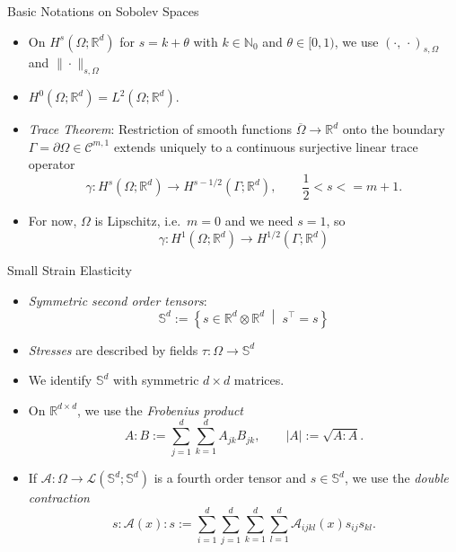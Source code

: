 \documentclass[10pt,aspectratio=169]{beamer}
\def\N{{\mathbb N}}
\def\R{{\mathbb R}}
\def\S{{\mathbb S}}
\def\cA{{\mathcal A}}
\def\cC{{\mathcal C}}
\def\cL{{\mathcal L}}
\begin{document}
\begin{frame}{Basic Notations on Sobolev Spaces}
	\begin{itemize}
		\item On $H^s(\Omega;\R^d)$ for $s =k+\theta$ with $k\in \N_0$ and $\theta\in[0,1)$, we use $(\cdot,\,\cdot)_{s,\Omega}$ and $\|\cdot\|_{s,\Omega}$
		\item $H^0(\Omega;\R^d) = L^2(\Omega;\R^d)$.
		\item {\em Trace Theorem}: Restriction of smooth functions $\overline{\Omega}\to\R^d$ onto the boundary $\Gamma = \partial\Omega\in\cC^{m,1}$ extends uniquely to a continuous surjective linear trace operator
		      \begin{equation*}
			      \gamma: H^s(\Omega;\R^d)\to H^{s-1/2}(\Gamma;\R^d),\qquad \frac{1}{2}<s<=m+1.
		      \end{equation*}
		\item For now, $\Omega$ is Lipschitz, i.e.\ $m=0$ and we need $s = 1$, so
		      \begin{equation*}
			      \gamma: H^1(\Omega;\R^d)\to H^{1/2}(\Gamma;\R^d)
		      \end{equation*}
	\end{itemize}
\end{frame}

\begin{frame}{Small Strain Elasticity}
	\begin{itemize}
		\item {\em Symmetric second order tensors}:
		      \begin{equation*}
			      \S^d:=\left\{s\in\R^d\otimes\R^d\;\middle|\;s^\top = s\right\}
		      \end{equation*}
		\item {\em Stresses} are described by fields $\tau:\Omega\to\S^d$
		\item We identify $\S^d$ with symmetric $d\times d$ matrices.
		\item On $\R^{d\times d}$, we use the {\em Frobenius product}
		      \begin{equation*}
			      A:B := \sum_{j=1}^d\sum_{k=1}^d A_{jk}B_{jk},
			      \qquad
			      |A| := \sqrt{A:A}.
		      \end{equation*}
		\item If $\cA:\Omega\to\cL(\S^d;\S^d)$ is a fourth order tensor and $s\in\S^d$, we use the {\em double contraction}
		      \begin{equation*}
			      s:\cA(x):s:=\sum_{i = 1}^d \sum_{j = 1}^d \sum_{k = 1}^d \sum_{l = 1}^d\cA_{ijkl}(x)s_{ij}s_{kl}.
		      \end{equation*}
	\end{itemize}
\end{frame}
\end{document}
